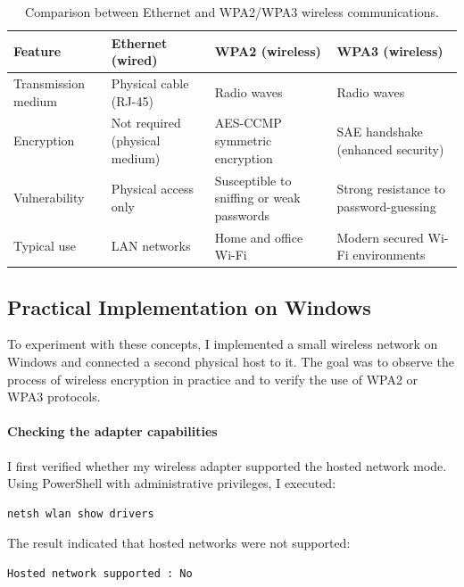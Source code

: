 \documentclass[12pt,a4paper]{report}
\begin{document}
\begin{table}[H]
\centering
\begin{tabular}{|p{3cm}|p{3.5cm}|p{3.5cm}|p{3.5cm}|}
\hline
\textbf{Feature} & \textbf{Ethernet (wired)} & \textbf{WPA2 (wireless)} & \textbf{WPA3 (wireless)} \\
\hline
Transmission medium & Physical cable (RJ-45) & Radio waves & Radio waves \\
\hline
Encryption & Not required (physical medium) & AES-CCMP symmetric encryption & SAE handshake (enhanced security) \\
\hline
Vulnerability & Physical access only & Susceptible to sniffing or weak passwords & Strong resistance to password-guessing \\
\hline
Typical use & LAN networks & Home and office Wi-Fi & Modern secured Wi-Fi environments \\
\hline
\end{tabular}
\caption{Comparison between Ethernet and WPA2/WPA3 wireless communications.}
\end{table}


\subsection{Practical Implementation on Windows}

To experiment with these concepts, I implemented a small wireless network on Windows 
and connected a second physical host to it.  
The goal was to observe the process of wireless encryption in practice 
and to verify the use of WPA2 or WPA3 protocols.


\paragraph{Checking the adapter capabilities}

I first verified whether my wireless adapter supported the hosted network mode.  
Using PowerShell with administrative privileges, I executed:

\begin{lstlisting}[language=bash]
netsh wlan show drivers
\end{lstlisting}

The result indicated that hosted networks were not supported:

\begin{verbatim}
Hosted network supported : No
\end{verbatim}
\end{document}

